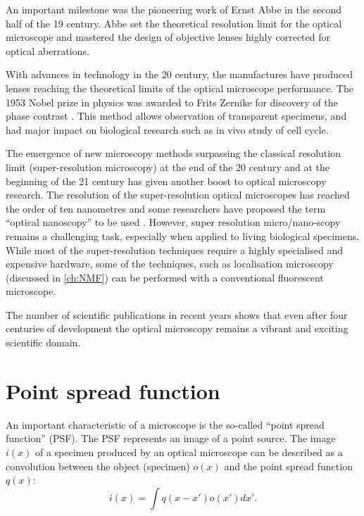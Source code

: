 An important milestone was the pioneering work of Ernst Abbe \cite{Abbe1873} in the second half of the 19\ths{} century. Abbe set the theoretical resolution limit for the optical microscope and mastered the design of objective lenses highly corrected for optical aberrations.

With advances in technology in the 20\ths{} century, the manufactures have produced lenses reaching the theoretical limits of the optical microscope performance. The 1953 Nobel prize in physics was awarded to Frits Zernike for discovery of the phase contrast \cite{Zernike1942}. This method allows observation of transparent specimens, and had major impact on biological research such as in vivo study of cell cycle. 

The emergence of new microscopy methods surpassing the classical resolution limit (super-resolution microscopy) at the end of the 20\ths{} century and at the beginning of the 21\st{} century has given another boost to optical microscopy research. The resolution of the super-resolution optical microscopes has reached the order of ten nanometres and some researchers have proposed the term ``optical nanoscopy'' to be used \cite{Egner2007, Hell2007, Hell2009}. However, super resolution micro/nano-scopy remains a challenging task, especially when applied to living biological specimens. While most of the super-resolution techniques require a highly specialised and expensive hardware, some of the techniques, such as localisation microscopy (discussed in \autoref{ch:NMF}) can be performed with a conventional fluorescent microscope. 

The number of scientific publications in recent years shows that even after four centuries of development the optical microscopy remains a vibrant and exciting scientific domain.


\section{Point spread function}

An important characteristic of a microscope is the so-called ``point spread function'' (PSF). The PSF represents an image of a point source. The image $i(x)$ of a specimen produced by an optical microscope can be described as a convolution between the object (specimen) $o(x)$ and the point spread function $q(x)$:
%
\begin{equation}
	i(x)=\int q(x-x')o(x')dx'.
	\label{eq:conv}
\end{equation}  

